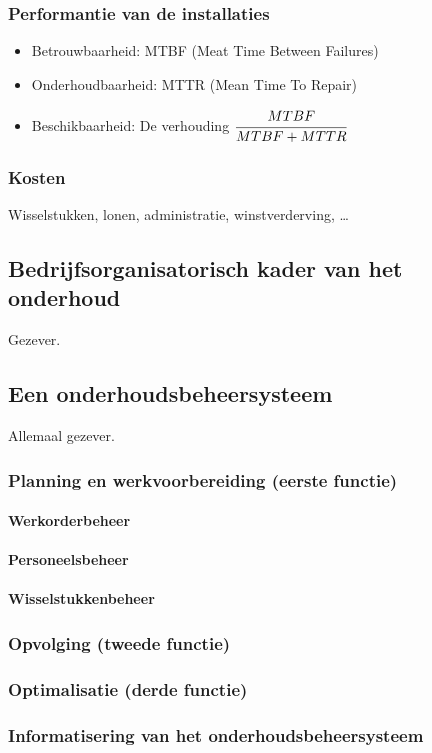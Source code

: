 \documentclass[12pt]{article}
\begin{document}
\subsubsection{Performantie van de installaties}
\begin{itemize}
\item Betrouwbaarheid: MTBF (Meat Time Between Failures)
\item Onderhoudbaarheid: MTTR (Mean Time To Repair)
\item Beschikbaarheid: De verhouding $\cfrac{MTBF}{MTBF + MTTR}$
\end{itemize}
\subsubsection{Kosten}
Wisselstukken, lonen, administratie, winstverderving, \dots
\subsection{Bedrijfsorganisatorisch kader van het onderhoud}
Gezever.
\subsection{Een onderhoudsbeheersysteem}
Allemaal gezever.
\subsubsection{Planning en werkvoorbereiding (eerste functie)}
\paragraph{Werkorderbeheer}
\paragraph{Personeelsbeheer}
\paragraph{Wisselstukkenbeheer}
\subsubsection{Opvolging (tweede functie)}
\subsubsection{Optimalisatie (derde functie)}
\subsubsection{Informatisering van het onderhoudsbeheersysteem}
\end{document}
